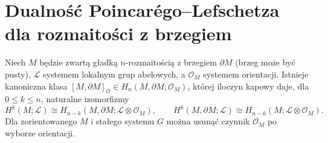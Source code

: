 \section{Dualność Poincarégo--Lefschetza dla rozmaitości z brzegiem}
\label{sec:pl-v4}
\begin{twierdzenie}
\label{thm:pl-v4}
Niech $M$ będzie zwartą gładką $n$-rozmaitością z brzegiem
$\partial M$ (brzeg może być pusty),
$\mathcal L$ systemem lokalnym grup abelowych, a
$\mathcal O_M$ systemem orientacji. Istnieje kanoniczna
klasa $[M,\partial M]_{\mathcal O}\in
H_n(M,\partial M;\mathcal O_M)$, której iloczyn kapowy
daje, dla $0\le k\le n$, naturalne izomorfizmy
\[
H^k(M;\mathcal L)\cong
H_{n-k}(M,\partial M;\mathcal L\otimes\mathcal O_M),\qquad
H^k(M,\partial M;\mathcal L)\cong
H_{n-k}(M;\mathcal L\otimes\mathcal O_M).
\]
Dla zorientowanego $M$ i stałego systemu $G$
można usunąć czynnik $\mathcal O_M$ po wyborze orientacji.
\end{twierdzenie}
